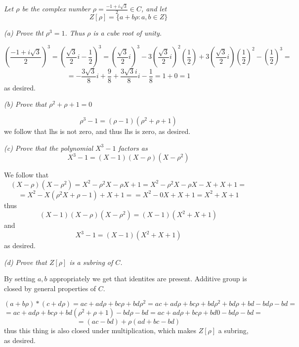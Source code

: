 \documentclass[11pt,oneside,titlepage]{book}
\newcommand{\set}[1]{\{ #1 \}}
\begin{document}
\subsection{}

\textit{Let $\rho$ be the complex number $\rho = \frac{-1 +
i\sqrt{3}}{2} \in C$, and let
  $$Z[\rho] = \set{a + b\rho: a, b \in Z}$$}

\textit{(a) Prove tht $\rho^3 = 1$. Thus $\rho$ is a cube root of
unity.}

$$\left(\frac{-1 + i\sqrt{3}}{2}\right)^3 =
\left(\frac{\sqrt{3}}{2} i - \frac{1}{2}\right)^3 =
\left(\frac{\sqrt{3}}{2} i \right)^3 - 3 \left(\frac{\sqrt{3}}{2} i
\right)^2 \left(\frac{1}{2} \right) + 3 \left(\frac{\sqrt{3}}{2} i
\right) \left(\frac{1}{2}\right)^2 - \left(\frac{1}{2}\right)^3 = $$
$$ = - \frac{3 \sqrt{3}}{8} i  + \frac{9}{8} + \frac{3 \sqrt{3} i}{8}i  - \frac{1}{8} =
1 + 0 = 1$$ as desired.

\textit{(b) Prove that $\rho^2 + \rho + 1 = 0$}

$$\rho^3 - 1 = (\rho - 1)(\rho^2 + \rho + 1)$$
we follow that lhs is not zero, and thus lhs is zero, as desired.

\textit{(c) Prove that the polynomial $X^3 - 1$ factors as
  $$X^3 - 1 = (X - 1)(X - \rho)(X - \rho^2)$$}


We follow that
$$(X - \rho) (X - \rho^2) = X^2 - \rho^2 X - \rho X + 1 = X^2 - \rho^2 X - \rho X - X + X + 1 =$$
$$ = X^2 - X(\rho^2 X+ \rho - 1) + X + 1 = = X^2 - 0X + X + 1 = X^2 + X + 1$$
thus
$$(X - 1) (X - \rho) (X - \rho^2)  = (X - 1) (X^2 + X + 1)$$
and
$$X^3 - 1 = (X - 1)(X^2 + X + 1)$$
as desired.

\textit{(d) Prove that $Z[\rho] $ is a subring of $C$.}

By setting $a, b$ appropriately we get that identites are
present. Additive group is closed by general properties of $C$.

$$(a + b \rho) * (c + d \rho) = ac + ad \rho + bc \rho + bd \rho^2 =
ac + ad \rho + bc \rho + bd \rho^2 + bd \rho + bd - bd\rho - bd = $$
$$ = ac + ad \rho + bc \rho + bd (\rho^2 + \rho + 1) - bd\rho - bd =
ac + ad \rho + bc \rho + bd 0 - bd\rho - bd =$$
$$ = (ac - bd) + \rho(ad + bc - bd)$$
thus this thing is also closed under multiplication, which makes
$Z[\rho]$ a subring, as desired.

\subsection{}
\end{document}
